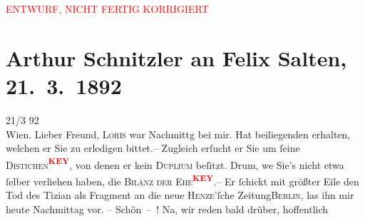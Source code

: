 
\begin{center}
            \textcolor{red}{ENTWURF, NICHT FERTIG KORRIGIERT}
                      \end{center}
            
         
         \renewcommand{\erwaehntePersonen}{Personen: Max Henze, Hugo von Hofmannsthal, Felix Salten}
         \renewcommand{\erwaehnteInstitutionen}{Institutionen: Allgemeine Theater-Revue für Bühne und Welt. Illustrierte Halbmonatsschrift}
         \renewcommand{\erwaehnteOrte}{Orte: Berlin, Café Central, Wien}
         \renewcommand{\erwaehnteWerke}{Werke: Der Tod des Tizian}
               \section[Arthur Schnitzler an Felix Salten, 21. 3. 1892]{ Arthur Schnitzler an Felix Salten, 21. 3. 1892}\nopagebreak{}\rehead{ }\begin{ledgroupsized}[t]{13cm}\normalsize\beginnumbering \toendnotes[C]{\smallbreak\pagebreak[2]} 
\toendnotes[C]{\smallbreak}\pstart
           \raggedleft{}{\pb}21/3 92{\\}Wien. \pend
           \pstart{}Lieber Freund,\pend\pstart
           \textsc{Loris} war Nachmittg bei mir. Hat beiliegenden \label{K_L02955-1v}\label{K_L02955-1h} erhalten, welchen er Sie zu erledigen bittet.– Zugleich
               erſucht er Sie um ſeine \textsc{Distichen\textcolor{red}{\textsuperscript{\textbf{KEY}}}}, von denen er kein \textsc{Duplium} beſitzt. Drum, we{\geminationn} Sie’s {\pb}nicht etwa ſelber verliehen haben,
               die \textsc{Bilanz der Ehe\textcolor{red}{\textsuperscript{\textbf{KEY}}}}.– \pend
           \pstart
           Er ſchickt mit größter Eile den Tod des Tizian
               als Fragment an die neue \textsc{Henze}’ſche Zeitung\textsc{Berlin}, las ihn mir heute Nachmittag vor. – Schön – ! Na, wir {\pb}reden bald drüber, hoffentlich

\end{ledgroupsized}
